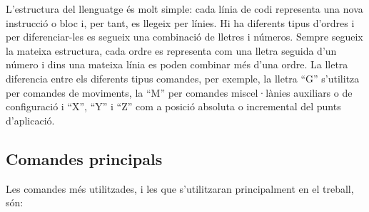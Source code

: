 L'estructura del llenguatge és molt simple: cada línia de codi representa una nova instrucció o bloc i, per tant, es llegeix per línies. Hi ha diferents tipus d'ordres i per diferenciar-les es segueix una combinació de lletres i números. Sempre segueix la mateixa estructura, cada ordre es representa com una lletra seguida d'un número i dins una mateixa línia es poden combinar més d'una ordre. La lletra diferencia entre els diferents tipus comandes, per exemple, la lletra “G” s'utilitza per comandes de moviments, la “M” per comandes miscel·lànies auxiliars o de configuració i “X”, “Y” i “Z” com a posició absoluta o incremental del punts d'aplicació.  

\subsection{Comandes principals}
Les comandes més utilitzades, i les que s'utilitzaran principalment en el treball, són:

